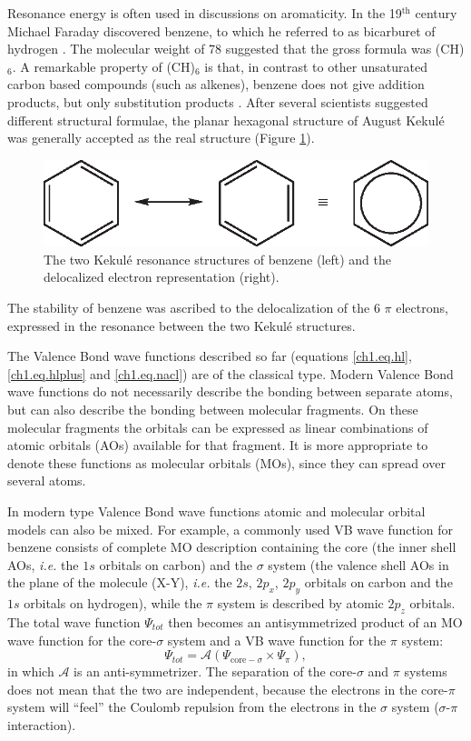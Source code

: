 Resonance energy is often used in discussions on aromaticity. In the 19$^\mathrm{th}$ century Michael Faraday discovered benzene, to which he referred to as bicarburet of hydrogen \cite{faraday,bicarburet}. The molecular weight of 78 suggested that the gross formula was (CH)$_6$. A remarkable property of (CH)$_6$ is that, in contrast to other unsaturated carbon based compounds (such as alkenes), benzene does not give addition products, but only substitution products \cite{bruice}. After several scientists suggested different structural formulae, the planar hexagonal structure of August Kekul\'e \cite{kekule} was generally accepted as the real structure (Figure \ref{ch1.fig.benzene}). 
\begin{figure}[htp]
\center
\includegraphics{introduction/figures/benzene.eps}
\caption{The two Kekul\'e resonance structures of benzene (left) and the delocalized electron representation (right).}
\label{ch1.fig.benzene}
\end{figure}
The stability of benzene was ascribed to the delocalization of the 6 $\pi$ electrons, expressed in the resonance between the two Kekul\'e structures.

The Valence Bond wave functions described so far (equations \ref{ch1.eq.hl}, \ref{ch1.eq.hlplus} and \ref{ch1.eq.nacl}) are of the classical type. Modern Valence Bond wave functions do not necessarily describe the bonding between separate atoms, but can also describe the bonding between molecular fragments. On these molecular fragments the orbitals can be expressed as linear combinations of atomic orbitals (AOs) available for that fragment. It is more appropriate to denote these functions as molecular orbitals (MOs), since they can spread over several atoms. 

In modern type Valence Bond wave functions atomic and molecular orbital models can also be mixed. For example, a commonly used VB wave function for benzene consists of complete MO description containing the core (the inner shell AOs, \textit{i.e.} the $1s$ orbitals on carbon) and the $\sigma$ system (the valence shell AOs in the plane of the molecule (X-Y), \textit{i.e.} the $2s$, $2p_x$, $2p_y$ orbitals on carbon and the $1s$ orbitals on hydrogen), while the $\pi$ system is described by atomic $2p_z$ orbitals. The total wave function $\Psi_{tot}$ then becomes an antisymmetrized product of an MO wave function for the core-$\sigma$ system and a VB wave function for the $\pi$ system:
\begin{equation}
\Psi_{tot} = \mathcal{A}(\Psi_{\mathrm{core}-\sigma} \times \Psi_{\pi}),
\label{ch1.eq.prodbenzene}
\end{equation}
in which $\mathcal{A}$ is an anti-symmetrizer. The separation of the core-$\sigma$ and $\pi$ systems does not mean that the two are independent, because the electrons in the core-$\pi$ system will ``feel'' the Coulomb repulsion from the electrons in the $\sigma$ system ($\sigma$-$\pi$ interaction).

